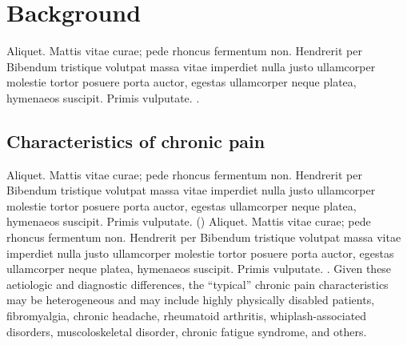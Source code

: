 


\chapter{Background}
\label{ch:1-Background}
Aliquet. Mattis vitae curae; pede rhoncus fermentum non. Hendrerit per Bibendum tristique volutpat massa vitae imperdiet nulla justo ullamcorper molestie tortor posuere porta auctor, egestas ullamcorper neque platea, hymenaeos suscipit. Primis vulputate.  \citep{world1992icd}.

\section{Characteristics of chronic pain}

\citet{breivik2006survey} Aliquet. Mattis vitae curae; pede rhoncus fermentum non. Hendrerit per Bibendum tristique volutpat massa vitae imperdiet nulla justo ullamcorper molestie tortor posuere porta auctor, egestas ullamcorper neque platea, hymenaeos suscipit. Primis vulputate.  (\citeyear{breivik2006survey}) Aliquet. Mattis vitae curae; pede rhoncus fermentum non. Hendrerit per Bibendum tristique volutpat massa vitae imperdiet nulla justo ullamcorper molestie tortor posuere porta auctor, egestas ullamcorper neque platea, hymenaeos suscipit. Primis vulputate. \citep{breivik2006survey}. Given these aetiologic and diagnostic differences, the ``typical'' chronic pain characteristics may be heterogeneous and may include highly physically disabled patients, fibromyalgia, chronic headache, rheumatoid arthritis, whiplash-associated disorders, muscoloskeletal disorder, chronic fatigue syndrome,  and others. 




